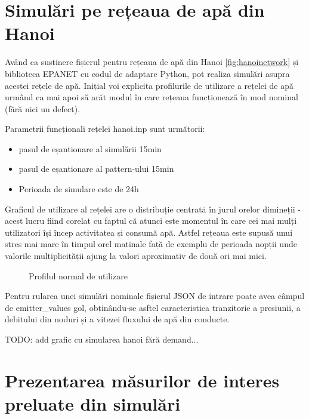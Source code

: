 

\section{Simulări pe rețeaua de apă din Hanoi}

Având ca susținere fișierul pentru rețeaua de apă din Hanoi \ref{fig:hanoinetwork} și biblioteca EPANET cu codul de
adaptare Python, pot realiza simulări asupra acestei rețele de apă. Inițial voi explicita profilurile de utilizare a
rețelei de apă urmând ca mai apoi să arăt modul în care rețeaua funcționează în mod nominal (fără nici un defect).

Parametrii funcționali rețelei hanoi.inp sunt următorii:

\begin{itemize}
    \item pasul de eșantionare al simulării 15min
    \item pasul de eșantionare al pattern-ului 15min
    \item Perioada de simulare este de 24h
\end{itemize}

Graficul de utilizare al rețelei are o distribuție centrată în jurul orelor dimineții - acest lucru fiind corelat cu faptul că atunci este momentul în care cei mai mulți utilizatori își încep activitatea și consumă apă. Astfel rețeaua este supusă unui stres mai mare în timpul orel matinale față de exemplu de perioada nopții unde valorile multiplicității ajung la valori aproximativ de două ori mai mici.

\begin{figure}[htbp]
    \label{fig:normalprofile}
  \centering
  
  \caption{Profilul normal de utilizare}
\end{figure}

Pentru rularea unei simulări nominale fișierul JSON de intrare poate avea câmpul de emitter\_values gol, obținându-se asftel caracteristica tranzitorie a presiunii, a debitului din noduri și a vitezei fluxului de apă din conducte.

TODO: add grafic cu simularea hanoi fără demand...

\section{Prezentarea măsurilor de interes preluate din simulări}

